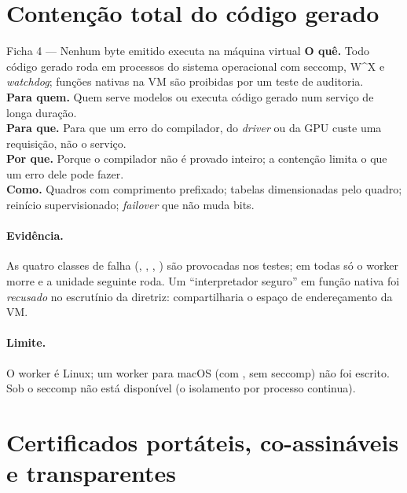 \section{Contenção total do código gerado}\label{sec:inov-contencao}

\begin{ficha}{Ficha 4 --- Nenhum byte emitido executa na máquina virtual}
\textbf{O quê.} Todo código gerado roda em processos do sistema operacional com seccomp, W\^{}X e \textit{watchdog}; funções nativas na VM são proibidas por um teste de auditoria.\\
\textbf{Para quem.} Quem serve modelos ou executa código gerado num serviço de longa duração.\\
\textbf{Para que.} Para que um erro do compilador, do \textit{driver} ou da GPU custe uma requisição, não o serviço.\\
\textbf{Por que.} Porque o compilador não é provado inteiro; a contenção limita o que um erro dele pode fazer.\\
\textbf{Como.} Quadros com comprimento prefixado; tabelas dimensionadas pelo quadro; reinício supervisionado; \textit{failover} que não muda bits.
\end{ficha}

\paragraph{Evidência.} As quatro classes de falha (, , , ) são provocadas nos testes; em todas só o worker morre e a unidade seguinte roda. Um ``interpretador seguro'' em função nativa foi \emph{recusado} no escrutínio da diretriz: compartilharia o espaço de endereçamento da VM.

\paragraph{Limite.} O worker é Linux; um worker para macOS (com , sem seccomp) não foi escrito. Sob  o seccomp não está disponível (o isolamento por processo continua).

\section{Certificados portáteis, co-assináveis e transparentes}\label{sec:inov-certificados}

